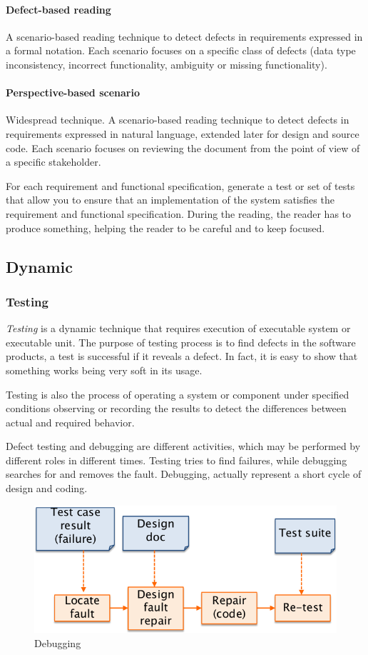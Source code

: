 \paragraph{Defect-based reading}
A scenario-based reading technique to detect defects in requirements expressed in a formal notation. Each scenario focuses on a specific class of defects (data type inconsistency, incorrect functionality, ambiguity or missing functionality).

\paragraph{Perspective-based scenario} Widespread technique. A scenario-based reading technique to detect defects in requirements expressed in natural language, extended later for design and source code. Each scenario focuses on reviewing the document from the point of view of a specific stakeholder.

For each requirement and functional specification, generate a test or set of tests that allow you to ensure that an implementation of the system satisfies the requirement and functional specification. During the reading, the reader has to produce something, helping the reader to be careful and to keep focused.

\subsection{Dynamic}
\subsubsection{Testing}
\emph{Testing} is a dynamic technique that requires execution of executable system or executable unit. The purpose of testing process is to find defects in the software products, a test is successful if it reveals a defect. In fact, it is easy to show that something works being very soft in its usage.

Testing is also the process of operating a system or component under specified conditions observing or recording the results to detect the differences between actual and required behavior.

Defect testing and debugging are different activities, which may be performed by different roles in different times. Testing tries to find failures, while debugging searches for and removes the fault. Debugging, actually represent a short cycle of design and coding.

\begin{figure}[hbtp]
\centering
\includegraphics[scale=0.35]{images/debugging.png}
\caption{Debugging}
\end{figure}

